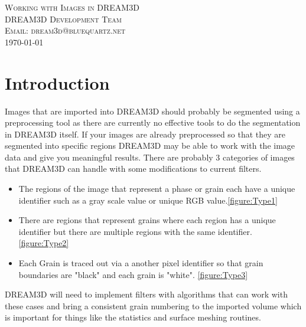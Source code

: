 \documentclass[12pt]{article} %
\begin{document}
\begin{titlepage}
\begin{center}
\textsc{\huge Working with Images in DREAM3D}\\[1.5cm]
\textsc{\large DREAM3D Development Team\\
Email: dream3d@bluequartz.net}\\[1.5cm]
\vfill
{\large \today}
\end{center}
\end{titlepage}

{}


\section{Introduction}


Images that are imported into DREAM3D should probably be segmented using a preprocessing tool as there are currently no effective tools to do the segmentation in DREAM3D itself. If your images are already preprocessed so that they are segmented into specific regions DREAM3D may be able to work with the image data and give you meaningful results. There are probably 3 categories of images that DREAM3D can handle with some modifications to current filters.


\begin{itemize}
\item The regions of the image that represent a phase or grain each have a unique identifier such as a gray scale value or unique RGB value.\ref{figure:Type1}
\item There are regions that represent grains where each region has a unique identifier but there are multiple regions with the same identifier. \ref{figure:Type2}
\item Each Grain is traced out via a another pixel identifier so that grain boundaries are "black" and each grain is "white". \ref{figure:Type3}
\end{itemize}

DREAM3D will need to implement filters with algorithms that can work with these cases and bring a consistent grain numbering to the imported volume which is important for things like the statistics and surface meshing routines.
\end{document}
